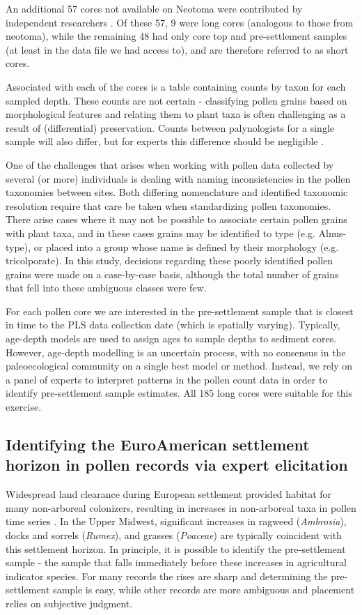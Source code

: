 \documentclass[12pt]{article}
\begin{document}
An additional 57 cores not available on Neotoma were contributed by
independent researchers \citep{kujawa2015}. Of these 57, 9 were long
cores (analogous to those from neotoma), while the remaining 48 had
only core top and pre-settlement samples (at least in the data file we
had access to), and are therefore referred to as short cores.

Associated with each of the cores is a table containing counts by
taxon for each sampled depth. These counts are not certain -
classifying pollen grains based on morphological features and relating
them to plant taxa is often challenging as a result of (differential)
preservation. Counts between palynologists for a single sample will
also differ, but for experts this difference should be negligible
\citep{XXX}.

One of the challenges that arises when working with pollen data
collected by several (or more) individuals is dealing with naming
inconsistencies in the pollen taxonomies between sites. Both differing
nomenclature and identified taxonomic resolution require that care be
taken when standardizing pollen taxonomies. There arise cases where it
may not be possible to associate certain pollen grains with plant
taxa, and in these cases grains may be identified to type
(e.g. Alnus-type), or placed into a group whose name is defined by
their morphology (e.g. tricolporate). In this study, decisions
regarding these poorly identified pollen grains were made on a
case-by-case basis, although the total number of grains that fell into
these ambiguous classes were few.

For each pollen core we are interested in the pre-settlement sample
that is closest in time to the PLS data collection date (which is
spatially varying). Typically, age-depth models are used to assign
ages to sample depths to sediment cores. However, age-depth modelling
is an uncertain process, with no consensus in the paleoecological
community on a single best model or method. Instead, we rely on a
panel of experts to interpret patterns in the pollen count data in
order to identify pre-settlement sample estimates. All 185 long cores were
suitable for this exercise.

\subsection{Identifying the EuroAmerican settlement horizon in pollen records via expert elicitation}
Widespread land clearance during European settlement provided habitat
for many non-arboreal colonizers, resulting in increases in
non-arboreal taxa in pollen time series \citep{mcandrews1988human}. In
the Upper Midwest, significant increases in ragweed
(\textit{Ambrosia}), docks and sorrels (\textit{Rumex}), and grasses
(\textit{Poaceae}) are typically coincident with this settlement
horizon. In principle, it is possible to identify the pre-settlement
sample - the sample that falls immediately before these increases in
agricultural indicator species. For many records the rises are sharp
and determining the pre-settlement sample is easy, while other records
are more ambiguous and placement relies on subjective judgment.
\end{document}
